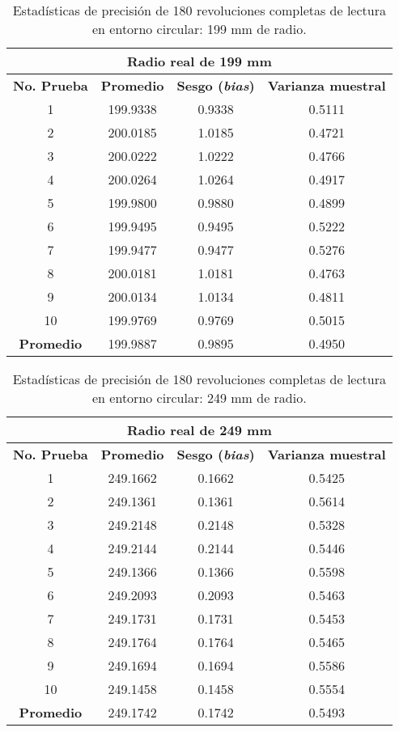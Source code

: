 \begin{table}[H]
	\centering
	\begin{tabular}{|c|c|c|c|}
		\hline
		\multicolumn{4}{|c|}{\textbf{Radio real de 199 mm}} \\ \hline
		\textbf{No. Prueba} & \textbf{Promedio} & \textbf{Sesgo (\textit{bias})} & \textbf{Varianza muestral} \\ \hline
		1 & 199.9338 & 0.9338 & 0.5111 \\ 
		2 & 200.0185 & 1.0185 & 0.4721 \\ 
		3 & 200.0222 & 1.0222 & 0.4766 \\ 
		4 & 200.0264 & 1.0264 & 0.4917 \\ 
		5 & 199.9800 & 0.9880 & 0.4899 \\ 
		6 & 199.9495 & 0.9495 & 0.5222 \\ 
		7 & 199.9477 & 0.9477 & 0.5276 \\ 
		8 & 200.0181 & 1.0181 & 0.4763 \\ 
		9 & 200.0134 & 1.0134 & 0.4811 \\ 
		10 & 199.9769 & 0.9769 & 0.5015 \\ \hline
		\textbf{Promedio} & 199.9887 & 0.9895 & 0.4950 \\ \hline
	\end{tabular}
	\caption{Estadísticas de precisión de 180 revoluciones completas de lectura en entorno circular: 199 mm de radio.}
	\label{fig:tabla_dists2}
\end{table}

\begin{table}[H]
	\centering
	\begin{tabular}{|c|c|c|c|}
		\hline
		\multicolumn{4}{|c|}{\textbf{Radio real de 249 mm}} \\ \hline
		\textbf{No. Prueba} & \textbf{Promedio} & \textbf{Sesgo (\textit{bias})} & \textbf{Varianza muestral} \\ \hline
		1 & 249.1662 & 0.1662 & 0.5425 \\ 
		2 & 249.1361 & 0.1361 & 0.5614 \\ 
		3 & 249.2148 & 0.2148 & 0.5328 \\ 
		4 & 249.2144 & 0.2144 & 0.5446 \\ 
		5 & 249.1366 & 0.1366 & 0.5598 \\ 
		6 & 249.2093 & 0.2093 & 0.5463 \\ 
		7 & 249.1731 & 0.1731 & 0.5453 \\ 
		8 & 249.1764 & 0.1764 & 0.5465 \\ 
		9 & 249.1694 & 0.1694 & 0.5586 \\ 
		10 & 249.1458 & 0.1458 & 0.5554 \\ \hline
		\textbf{Promedio} & 249.1742 & 0.1742 & 0.5493 \\ \hline
	\end{tabular}
	\caption{Estadísticas de precisión de 180 revoluciones completas de lectura en entorno circular: 249 mm de radio.}
	\label{fig:tabla_dists3}
\end{table}


